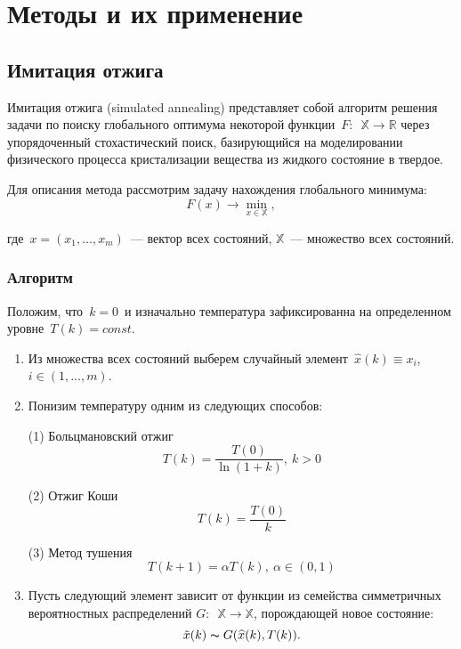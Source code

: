 

\chapter{Методы и их применение} \label{chap2}

\section{Имитация отжига}

	\noindent
	Имитация отжига (simulated annealing) представляет собой алгоритм решения задачи по поиску глобального оптимума некоторой функции~$F:$~$\mathbb{X} \to \mathbb{R}$ через упорядоченный стохастический поиск, базирующийся на моделировании физического процесса кристализации вещества из жидкого состояние в твердое.
	
	Для описания метода рассмотрим задачу нахождения глобального минимума:
	\[
		F(x) \to \min \limits _{x \in \mathbb{X}},
	\]
	
	\noindent где~$x = (x_{1},\ldots , x_{m})$~--- вектор всех состояний, $\mathbb{X}$~--- множество всех состояний.
	
	\subsection{Алгоритм}
	
	\noindent Положим, что~$k = 0$~и изначально температура зафиксированна на определенном уровне~$T(k) = const$.


	\begin{enumerate}
		\item  Из множества всех состояний выберем случайный элемент~$\widehat{x}(k) \equiv x_i$, $i \in (1, ..., m)$.
		
		\item Понизим температуру одним из следующих способов:
		
			(1) Больцмановский отжиг
			\begin{equation}
			T(k) =  \dfrac{T(0)}{\ln (1 + k)}, \ k > 0
			\label{eq:boltzman}
			\end{equation}
			
			(2) Отжиг Коши
			\begin{equation}
			T(k)  =  \dfrac{T(0)}{k}
			\end{equation}
			
			(3) Метод тушения
			\begin{equation}
			T(k+1) = \alpha T(k),\ \alpha \in (0, 1)
			\end{equation}
		
		\item Пусть следующий элемент зависит от функции из семейства симметричных вероятностных распределений $G:$~$ \mathbb{X} \to \mathbb{X}$, порождающей новое состояние:
		\[
		\tilde{x}(k) \thicksim G(\widehat{x}(k), T(k)).
		\]
		
		\end{enumerate}
	
